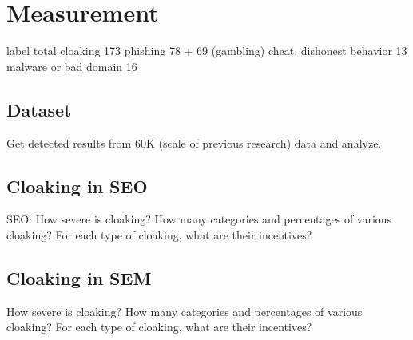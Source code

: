 \section{Measurement}
\label{s:measurement}

label total cloaking
173
phishing
78 + 69 (gambling)
cheat, dishonest behavior
13
malware or bad domain
16



\subsection{Dataset}
Get detected results from 60K (scale of previous research) data and analyze. 

\subsection{Cloaking in SEO}

SEO: How severe is cloaking? How many categories and percentages of various
cloaking? For each type of cloaking, what are their incentives?



\subsection{Cloaking in SEM}

How severe is cloaking? How many categories and percentages of various cloaking?
For each type of cloaking, what are their incentives?


